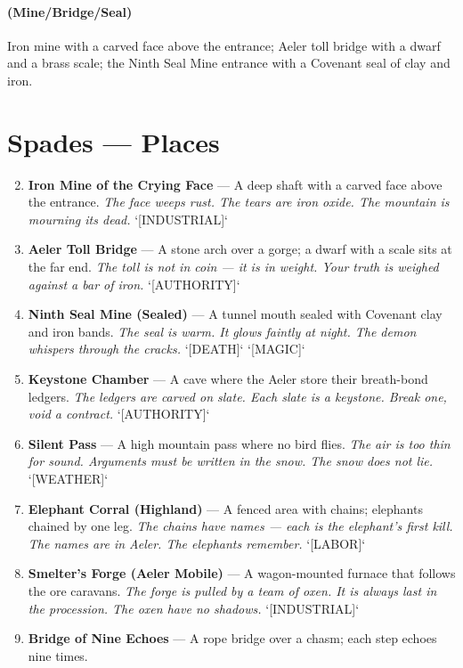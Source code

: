 \paragraph*{(Mine/Bridge/Seal)} Iron mine with a carved face above the entrance; Aeler toll bridge with a dwarf and a brass scale; the Ninth Seal Mine entrance with a Covenant seal of clay and iron.

\section*{Spades --- Places}
\label{sec:himadri-places}
\begin{enumerate}
\setcounter{enumi}{1}
\item \textbf{Iron Mine of the Crying Face} --- A deep shaft with a carved face above the entrance.
  \hfill \textit{The face weeps rust. The tears are iron oxide. The mountain is mourning its dead.} `[INDUSTRIAL]`
\item \textbf{Aeler Toll Bridge} --- A stone arch over a gorge; a dwarf with a scale sits at the far end.
  \hfill \textit{The toll is not in coin — it is in weight. Your truth is weighed against a bar of iron.} `[AUTHORITY]`
\item \textbf{Ninth Seal Mine (Sealed)} --- A tunnel mouth sealed with Covenant clay and iron bands.
  \hfill \textit{The seal is warm. It glows faintly at night. The demon whispers through the cracks.} `[DEATH]` `[MAGIC]`
\item \textbf{Keystone Chamber} --- A cave where the Aeler store their breath-bond ledgers.
  \hfill \textit{The ledgers are carved on slate. Each slate is a keystone. Break one, void a contract.} `[AUTHORITY]`
\item \textbf{Silent Pass} --- A high mountain pass where no bird flies.
  \hfill \textit{The air is too thin for sound. Arguments must be written in the snow. The snow does not lie.} `[WEATHER]`
\item \textbf{Elephant Corral (Highland)} --- A fenced area with chains; elephants chained by one leg.
  \hfill \textit{The chains have names — each is the elephant's first kill. The names are in Aeler. The elephants remember.} `[LABOR]`
\item \textbf{Smelter's Forge (Aeler Mobile)} --- A wagon-mounted furnace that follows the ore caravans.
  \hfill \textit{The forge is pulled by a team of oxen. It is always last in the procession. The oxen have no shadows.} `[INDUSTRIAL]`
\item \textbf{Bridge of Nine Echoes} --- A rope bridge over a chasm; each step echoes nine times.

\end{enumerate}
